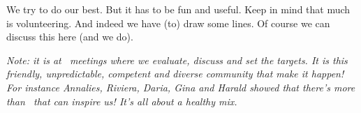 \stoptitle

\starttitle[title=Therefore \unknown]

\startitemize
\startitem We try to do our best. \stopitem
\startitem But it has to be fun and useful. \stopitem
\startitem Keep in mind that much is volunteering. \stopitem
\startitem And indeed we have (to) draw some lines. \stopitem
\startitem Of course we can discuss this here (and we do). \stopitem
\stopitemize

\vfilll

{\em Note: it is at \CONTEXT\ meetings where we evaluate, discuss and set the targets.
It is this friendly, unpredictable, competent and diverse community that make it
happen! For instance Annalies, Riviera, Daria, Gina and Harald showed that there's more
than \TEX\ that can inspire us! It's all about a healthy mix.}

\stoptitle

\stopdocument
